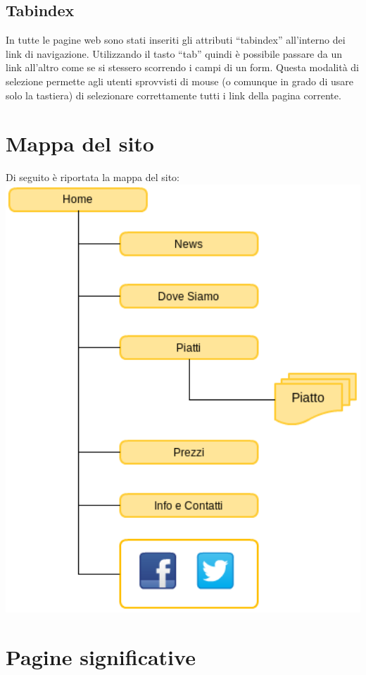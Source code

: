 \documentclass[10pt,a4paper,onecolumn]{article}
\begin{document}
\subsection{Tabindex}

In tutte le pagine web sono stati inseriti gli attributi ``tabindex'' all'interno dei link di navigazione. Utilizzando il tasto ``tab'' quindi è possibile passare da un link all'altro come se si stessero scorrendo i campi di un form. Questa modalità di selezione permette agli utenti sprovvisti di mouse (o comunque in grado di usare solo la tastiera) di selezionare correttamente tutti i link della pagina corrente.



\section{Mappa del sito}
Di seguito è riportata la mappa del sito:\\
\includegraphics[width=1.1\textwidth]{mappasito.png}


\clearpage

\section{Pagine significative}
\end{document}
